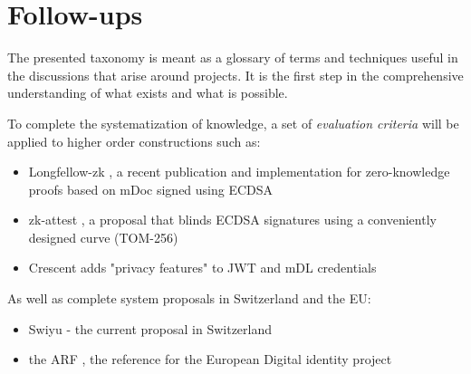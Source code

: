 \section{Follow-ups}
\label{sec:follow-up}

The presented taxonomy is meant as a glossary of terms and techniques useful in the discussions that arise around \eid projects. It is the first step in the comprehensive understanding of what exists and what is possible. 

To complete the systematization of knowledge, a set of \emph{evaluation criteria} will be applied to higher order constructions such as:

\begin{itemize}
    \item Longfellow-zk \cite{FS24}, a recent publication and implementation for zero-knowledge proofs based on mDoc signed using ECDSA
    \item zk-attest \cite{zkattest-rs}, a proposal that blinds ECDSA signatures using a conveniently designed curve (TOM-256)
    \item Crescent \cite{FFL25} adds "privacy features" to JWT and mDL credentials
\end{itemize}

As well as complete system proposals in Switzerland and the EU:

\begin{itemize}
    \item Swiyu \cite{Swiyu} - the current \eid  proposal in Switzerland
    \item the ARF \cite{EUDI-ARF}, the reference for the European Digital identity project
\end{itemize}
